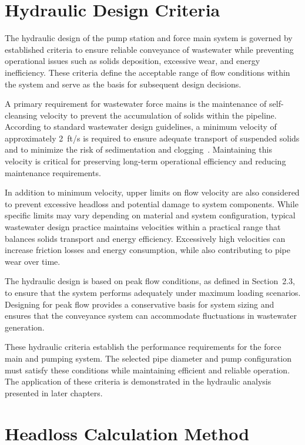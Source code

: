 \section{Hydraulic Design Criteria}

The hydraulic design of the pump station and force main system is governed by established criteria to ensure reliable conveyance of wastewater while preventing operational issues such as solids deposition, excessive wear, and energy inefficiency. These criteria define the acceptable range of flow conditions within the system and serve as the basis for subsequent design decisions.

A primary requirement for wastewater force mains is the maintenance of self-cleansing velocity to prevent the accumulation of solids within the pipeline. According to standard wastewater design guidelines, a minimum velocity of approximately 2~ft/s is required to ensure adequate transport of suspended solids and to minimize the risk of sedimentation and clogging~\cite{TenStates_RecommendedStandards_2014}. Maintaining this velocity is critical for preserving long-term operational efficiency and reducing maintenance requirements.

In addition to minimum velocity, upper limits on flow velocity are also considered to prevent excessive headloss and potential damage to system components. While specific limits may vary depending on material and system configuration, typical wastewater design practice maintains velocities within a practical range that balances solids transport and energy efficiency. Excessively high velocities can increase friction losses and energy consumption, while also contributing to pipe wear over time.

The hydraulic design is based on peak flow conditions, as defined in Section~2.3, to ensure that the system performs adequately under maximum loading scenarios. Designing for peak flow provides a conservative basis for system sizing and ensures that the conveyance system can accommodate fluctuations in wastewater generation.

These hydraulic criteria establish the performance requirements for the force main and pumping system. The selected pipe diameter and pump configuration must satisfy these conditions while maintaining efficient and reliable operation. The application of these criteria is demonstrated in the hydraulic analysis presented in later chapters.


\section{Headloss Calculation Method}

